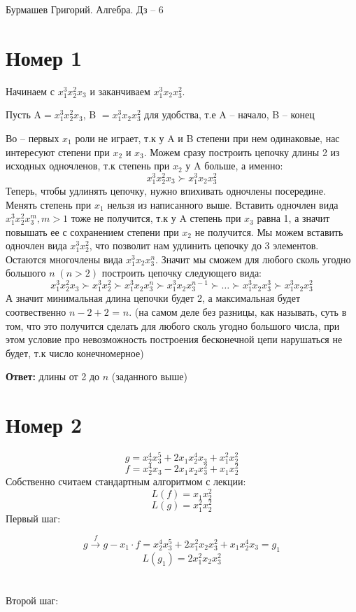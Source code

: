 \documentclass[a4paper,12pt]{article}
\author{Бурмашев Григорий, БПМИ-208}
\title{}
\date{\today}
\begin{document}
\begin{center}
Бурмашев Григорий. Алгебра. Дз -- 6
\end{center}
\section*{Номер 1}
\begin{center}
Начинаем с $x_1^3x_2^2x_3$ и заканчиваем $x_1^3x_2x_3^2$. 
\end{center}
\begin{center}
Пусть A$ = x_1^3x_2^2x_3$, B $ = x_1^3x_2x_3^2$ для удобства,
т.е A --  начало, B -- конец
\end{center}

Во -- первых $x_1$  роли не играет, т.к у A и B степени при нем одинаковые, нас интересуют степени при $x_2$ и $x_3$. Можем сразу построить цепочку длины 2 из исходных одночленов, т.к степень при $x_2$ у A больше, а именно:
\[
x_1^3x_2^2x_3 \succ x_1^3x_2x_3^2
\]
Теперь, чтобы удлинять цепочку, нужно впихивать одночлены посередине. Менять степень при $x_1$ нельзя из написанного выше. Вставить одночлен вида $x_1^3x_2^2x_3^m, m > 1 $ тоже не получится, т.к у A степень при $x_3$ равна 1, а значит повышать ее с сохранением степени при $x_2$ не получится. Мы можем вставить одночлен вида $x_1^3x_2^2$, что позволит нам удлинить цепочку до 3 элементов. Остаются многочлены вида $x_1^3x_2x_3^n$. Значит мы сможем для любого сколь угодно большого $n \;(n > 2)$ построить цепочку следующего вида:
\[
x_1^3x_2^2x_3 \succ x_1^3x_2^2 \succ x_1^3x_2x_3^n \succ x_1^3x_2x_3^{n-1} \succ \ldots \succ x_1^3x_2x_3^3 \succ  x_1^3x_2x_3^2
\]
А значит минимальная длина цепочки будет 2, а максимальная будет соотвественно $n - 2 + 2$ = $n$. (на самом деле без разницы, как называть, суть в том, что это получится сделать для любого сколь угодно большого числа, при этом условие про невозможность построения бесконечной цепи нарушаться не будет, т.к число конечномерное)
\begin{center}
\textbf{Ответ: } длины от 2 до $n$ (заданного выше)
\end{center}
\clearpage
\section*{Номер 2}
\[
g = x_2^4x_3^5 + 2x_1x_2^4x_3 + x_1^2x_2^2
\]
\[
f = x_2^4x_3 - 2x_1x_2x_3^2 + x_1x_2^2
\]
Собственно считаем стандартным алгоритмом с лекции:
\[
L(f) =  x_1x_2^2
\]
\[
L(g) = x_1^2x_2^2
\]
Первый шаг:

\[
g \overset{f}{\rightarrow} g - x_1 \cdot f = x_2^4x_3^5 + 2x_1^2x_2x_3^2 + x_1x_2^4x_3 = g_1
\]
\[
L(g_1) = 2x_1^2x_2x_3^2
\]
\\\\
Второй шаг:
\end{document}
